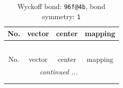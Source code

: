 \documentclass[fleqn,8pt]{jsarticle}
\begin{document}
\renewcommand{\arraystretch}{1.2}
\begin{longtable}{cccc}
\caption{Wyckoff bond: {\tt 96f@4b}, bond symmetry: {\tt 1}}
 \\
 \hline \hline
No. & vector & center & mapping \\ \hline \endfirsthead

\multicolumn{3}{l}{\tablename\ \thetable{}} \\
 \hline \hline
No. & vector & center & mapping \\ \hline \endhead

 \hline \hline
\multicolumn{3}{r}{\footnotesize\it continued ...} \\ \endfoot

 \hline \hline
\multicolumn{3}{r}{} \\ \endlastfoot


\end{longtable}
\end{document}
